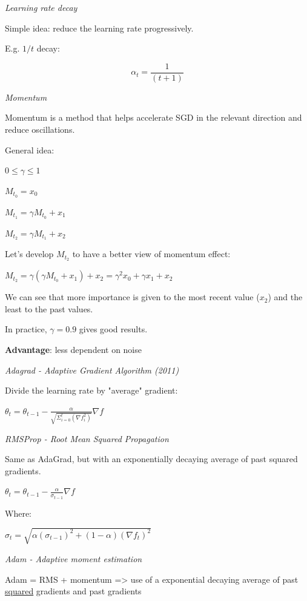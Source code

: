 \textit{Learning rate decay}

Simple idea: reduce the learning rate progressively.

E.g. $1/t$ decay:

$$\alpha_t=\frac{1}{(t+1)}$$

\vspace{5mm}
\textit{Momentum}

Momentum is a method that helps accelerate SGD in the relevant direction and reduce oscillations.

General idea:

$0 \le \gamma \le 1$

$M_{t_0}=x_0$

$M_{t_1}=\gamma M_{t_0} + x_1$

$M_{t_2}=\gamma M_{t_1} + x_2$

Let's develop $M_{t_2}$ to have a better view of momentum effect:

$M_{t_2} = \gamma (\gamma M_{t_0} + x_1) + x_2 = \gamma^2 x_0 + \gamma x_1 + x_2$

We can see that more importance is given to the most recent value ($x_2$) and the least to the past values.

\vspace{5mm}

In practice, $\gamma = 0.9$ gives good results.

\textbf{Advantage}: less dependent on noise

\vspace{5mm}
\textit{Adagrad - Adaptive Gradient Algorithm (2011)}

Divide the learning rate by "average" gradient:

$\theta_t = \theta_{t-1} - \frac{\alpha}{\sqrt{\Sigma_{i=0}^t(\nabla f_i^2)}}\nabla f$

\vspace{5mm}
\textit{RMSProp - Root Mean Squared Propagation}

Same as AdaGrad, but with an exponentially decaying average of past squared gradients.

$\theta_t = \theta_{t-1} - \frac{\alpha}{\sigma_{t-1}}\nabla f$

Where:

$\sigma_{t} = \sqrt{\alpha (\sigma_{t-1})^2+(1-\alpha)(\nabla f_t)^2}$


\vspace{5mm}
\textit{Adam - Adaptive moment estimation}

Adam = RMS + momentum => use of a exponential decaying average of past \underline{squared} gradients and past gradients

\vspace{5mm}